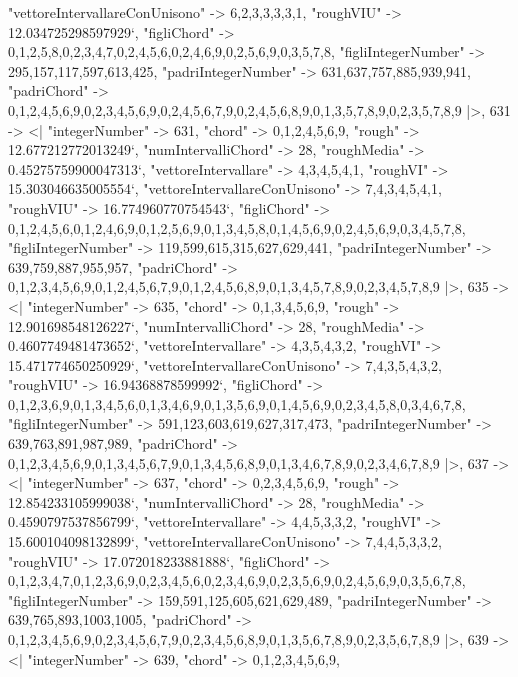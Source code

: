\documentclass[
]{article}
\begin{document}
\begin{DatasetVerbatim}
    "vettoreIntervallareConUnisono" -> {6,2,3,3,3,3,1},
    "roughVIU" -> 12.034725298597929`,
    "figliChord" -> {{0,1,2,5,8},{0,2,3,4,7},{0,2,4,5,6},{0,2,4,6,9},{0,2,5,6,9},{0,3,5,7,8}},
    "figliIntegerNumber" -> {295,157,117,597,613,425},
    "padriIntegerNumber" -> {631,637,757,885,939,941},
    "padriChord" -> {{0,1,2,4,5,6,9},{0,2,3,4,5,6,9},{0,2,4,5,6,7,9},{0,2,4,5,6,8,9},{0,1,3,5,7,8,9},{0,2,3,5,7,8,9}}
  |>,
  631 -> <|
    "integerNumber" -> 631,
    "chord" -> {0,1,2,4,5,6,9},
    "rough" -> 12.677212772013249`,
    "numIntervalliChord" -> 28,
    "roughMedia" -> 0.45275759900047313`,
    "vettoreIntervallare" -> {4,3,4,5,4,1},
    "roughVI" -> 15.303046635005554`,
    "vettoreIntervallareConUnisono" -> {7,4,3,4,5,4,1},
    "roughVIU" -> 16.774960770754543`,
    "figliChord" -> {{0,1,2,4,5,6},{0,1,2,4,6,9},{0,1,2,5,6,9},{0,1,3,4,5,8},{0,1,4,5,6,9},{0,2,4,5,6,9},{0,3,4,5,7,8}},
    "figliIntegerNumber" -> {119,599,615,315,627,629,441},
    "padriIntegerNumber" -> {639,759,887,955,957},
    "padriChord" -> {{0,1,2,3,4,5,6,9},{0,1,2,4,5,6,7,9},{0,1,2,4,5,6,8,9},{0,1,3,4,5,7,8,9},{0,2,3,4,5,7,8,9}}
  |>,
  635 -> <|
    "integerNumber" -> 635,
    "chord" -> {0,1,3,4,5,6,9},
    "rough" -> 12.901698548126227`,
    "numIntervalliChord" -> 28,
    "roughMedia" -> 0.4607749481473652`,
    "vettoreIntervallare" -> {4,3,5,4,3,2},
    "roughVI" -> 15.471774650250929`,
    "vettoreIntervallareConUnisono" -> {7,4,3,5,4,3,2},
    "roughVIU" -> 16.94368878599992`,
    "figliChord" -> {{0,1,2,3,6,9},{0,1,3,4,5,6},{0,1,3,4,6,9},{0,1,3,5,6,9},{0,1,4,5,6,9},{0,2,3,4,5,8},{0,3,4,6,7,8}},
    "figliIntegerNumber" -> {591,123,603,619,627,317,473},
    "padriIntegerNumber" -> {639,763,891,987,989},
    "padriChord" -> {{0,1,2,3,4,5,6,9},{0,1,3,4,5,6,7,9},{0,1,3,4,5,6,8,9},{0,1,3,4,6,7,8,9},{0,2,3,4,6,7,8,9}}
  |>,
  637 -> <|
    "integerNumber" -> 637,
    "chord" -> {0,2,3,4,5,6,9},
    "rough" -> 12.854233105999038`,
    "numIntervalliChord" -> 28,
    "roughMedia" -> 0.4590797537856799`,
    "vettoreIntervallare" -> {4,4,5,3,3,2},
    "roughVI" -> 15.600104098132899`,
    "vettoreIntervallareConUnisono" -> {7,4,4,5,3,3,2},
    "roughVIU" -> 17.072018233881888`,
    "figliChord" -> {{0,1,2,3,4,7},{0,1,2,3,6,9},{0,2,3,4,5,6},{0,2,3,4,6,9},{0,2,3,5,6,9},{0,2,4,5,6,9},{0,3,5,6,7,8}},
    "figliIntegerNumber" -> {159,591,125,605,621,629,489},
    "padriIntegerNumber" -> {639,765,893,1003,1005},
    "padriChord" -> {{0,1,2,3,4,5,6,9},{0,2,3,4,5,6,7,9},{0,2,3,4,5,6,8,9},{0,1,3,5,6,7,8,9},{0,2,3,5,6,7,8,9}}
  |>,
  639 -> <|
    "integerNumber" -> 639,
    "chord" -> {0,1,2,3,4,5,6,9},

\end{DatasetVerbatim}
\end{document}
